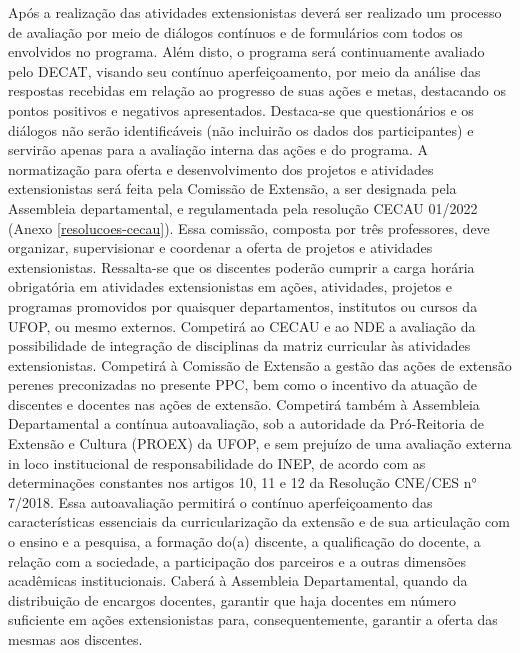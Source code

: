 \documentclass[
	12pt,				%
	openright,			%
	oneside,			%
	a4paper,			%
	english,			%
	brazil				%
	]{abntex2}
\begin{document}
Após a realização das atividades extensionistas deverá ser realizado um processo de avaliação por meio de diálogos contínuos e de formulários com todos os envolvidos no programa. Além disto, o programa será continuamente avaliado pelo DECAT, visando seu contínuo aperfeiçoamento, por meio da análise das respostas recebidas em relação ao progresso de suas ações e metas, destacando os pontos positivos e negativos apresentados. Destaca-se que questionários e os diálogos não serão identificáveis (não incluirão os dados dos participantes) e servirão apenas para a avaliação interna das ações e do programa.
A normatização para oferta e desenvolvimento dos projetos e atividades extensionistas será feita pela Comissão de Extensão, a ser designada pela Assembleia departamental, e regulamentada pela resolução CECAU 01/2022 (Anexo \ref{resolucoes-cecau}). Essa comissão, composta por três professores, deve organizar, supervisionar e coordenar a oferta de projetos e atividades extensionistas.
Ressalta-se que os discentes poderão cumprir a carga horária obrigatória em atividades
extensionistas em ações, atividades, projetos e programas promovidos por quaisquer departamentos, institutos ou cursos da UFOP, ou mesmo externos.
Competirá ao CECAU e ao NDE a avaliação da possibilidade de integração de disciplinas da matriz curricular às atividades extensionistas. Competirá à Comissão de Extensão a gestão das ações de extensão perenes preconizadas no presente PPC, bem como o incentivo da atuação de discentes e docentes nas ações de extensão. Competirá também à Assembleia Departamental a contínua autoavaliação, sob a autoridade da Pró-Reitoria de Extensão e Cultura (PROEX) da UFOP, e sem prejuízo de uma avaliação externa in loco institucional de responsabilidade do INEP, de acordo com as determinações constantes nos artigos 10, 11 e 12 da Resolução CNE/CES n° 7/2018. Essa autoavaliação permitirá o contínuo aperfeiçoamento das características essenciais da curricularização da extensão e de sua articulação com o ensino e a pesquisa, a formação do(a) discente, a qualificação do docente, a relação com a sociedade, a participação dos parceiros e a outras dimensões acadêmicas institucionais. Caberá à Assembleia Departamental, quando da distribuição de encargos docentes, garantir que haja docentes em número suficiente em ações extensionistas para, consequentemente, garantir a oferta das mesmas aos discentes.
\end{document}
